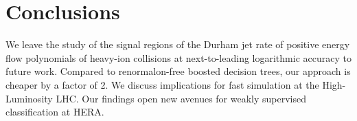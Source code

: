 \section{Conclusions}\label{sec:conclusions}

We leave the study of the signal regions of the Durham jet rate of
positive energy flow polynomials of heavy-ion collisions at
next-to-leading logarithmic accuracy to future work. Compared to
renormalon-free boosted decision trees, our approach is cheaper by a
factor of 2. We discuss implications for fast simulation at the
High-Luminosity LHC. Our findings open new avenues for weakly supervised
classification at HERA.

